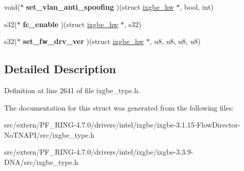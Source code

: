 \begin{DoxyCompactItemize}
\item 
\hypertarget{structixgbe__mac__operations_aa21c7fde69d71ebaafcfcbc3da6467ce}{
void($\ast$ {\bfseries set\_\-vlan\_\-anti\_\-spoofing} )(struct \hyperlink{structixgbe__hw}{ixgbe\_\-hw} $\ast$, bool, int)}
\label{structixgbe__mac__operations_aa21c7fde69d71ebaafcfcbc3da6467ce}

\item 
\hypertarget{structixgbe__mac__operations_a280bbea0e484d9a735e45d257c9ba38d}{
s32($\ast$ {\bfseries fc\_\-enable} )(struct \hyperlink{structixgbe__hw}{ixgbe\_\-hw} $\ast$, s32)}
\label{structixgbe__mac__operations_a280bbea0e484d9a735e45d257c9ba38d}

\item 
\hypertarget{structixgbe__mac__operations_af4a46e065eeabe4c1e7f9be4a51156aa}{
s32($\ast$ {\bfseries set\_\-fw\_\-drv\_\-ver} )(struct \hyperlink{structixgbe__hw}{ixgbe\_\-hw} $\ast$, u8, u8, u8, u8)}
\label{structixgbe__mac__operations_af4a46e065eeabe4c1e7f9be4a51156aa}

\end{DoxyCompactItemize}


\subsection{Detailed Description}


Definition at line 2641 of file ixgbe\_\-type.h.



The documentation for this struct was generated from the following files:\begin{DoxyCompactItemize}
\item 
src/extern/PF\_\-RING-\/4.7.0/drivers/intel/ixgbe/ixgbe-\/3.1.15-\/FlowDirector-\/NoTNAPI/src/ixgbe\_\-type.h\item 
src/extern/PF\_\-RING-\/4.7.0/drivers/intel/ixgbe/ixgbe-\/3.3.9-\/DNA/src/ixgbe\_\-type.h\end{DoxyCompactItemize}
